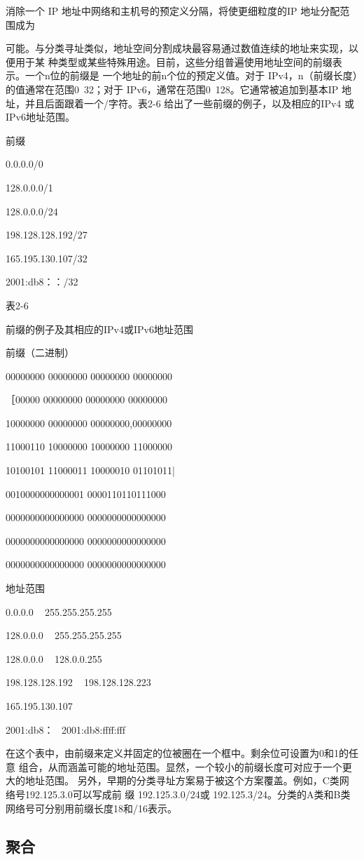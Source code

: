 消除一个 IP 地址中网络和主机号的预定义分隔，将使更细粒度的IP 地址分配范围成为

可能。与分类寻址类似，地址空间分割成块最容易通过数值连续的地址来实现，以便用于某
种类型或某些特殊用途。目前，这些分组普遍使用地址空间的前缀表示。一个n位的前缀是
一个地址的前n个位的预定义值。对于 IPv4，n（前缀长度）的值通常在范围0~32；对于
IPv6，通常在范围0~128。它通常被追加到基本IP 地址，并且后面跟着一个/字符。表2-6
给出了一些前缀的例子，以及相应的IPv4 或IPv6地址范围。

前缀

0.0.0.0/0

128.0.0.0/1

128.0.0.0/24

198.128.128.192/27

165.195.130.107/32

2001:db8：：/32

表2-6

前缀的例子及其相应的IPv4或IPv6地址范围

前缀（二进制）

00000000 00000000 00000000 00000000

［00000 00000000 00000000 00000000

10000000 00000000 00000000,00000000

11000110 10000000 10000000 11000000

10100101 11000011 10000010 01101011|

0010000000000001 0000110110111000

0000000000000000 0000000000000000

0000000000000000 0000000000000000

0000000000000000 0000000000000000

地址范围

0.0.0.0 ~ 255.255.255.255

128.0.0.0 ~ 255.255.255.255

128.0.0.0 ~ 128.0.0.255

198.128.128.192 ~ 198.128.128.223

165.195.130.107

2001:db8：~ 2001:db8:ffff:fff

在这个表中，由前缀来定义并固定的位被圈在一个框中。剩余位可设置为0和1的任意
组合，从而涵盖可能的地址范围。显然，一个较小的前缀长度可对应于一个更大的地址范围。
另外，早期的分类寻址方案易于被这个方案覆盖。例如，C类网络号192.125.3.0可以写成前
缀 192.125.3.0/24或 192.125.3/24。分类的A类和B类网络号可分别用前缀长度18和/16表示。

\subsection{聚合}

